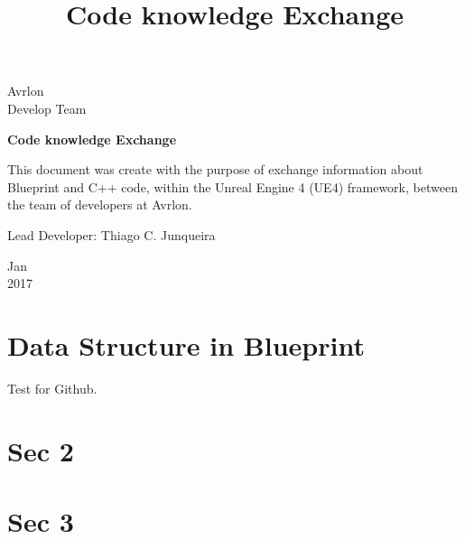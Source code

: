 \documentclass[a4paper, 12pt]{article}
\begin{document}
\begin{titlepage}
	\begin{center}
	

		\Huge{Avrlon}\\
		\large{Develop Team}\\ 
\vspace{15pt}
        
        \vspace{85pt}
        
		\textbf{\LARGE{Code knowledge Exchange}}
		\title{\large{Code knowledge Exchange}}
			
	\end{center}
\vspace{1,5cm}
	
	\begin{flushright}

   \begin{list}{}{
      \setlength{\leftmargin}{4.5cm}
      \setlength{\rightmargin}{0cm}
      \setlength{\labelwidth}{0pt}
      \setlength{\labelsep}{\leftmargin}}

      \item This document was create with the purpose of exchange information about Blueprint and C++ code, within the Unreal Engine 4 (UE4) framework, between the team of developers at Avrlon.    

      \begin{list}{}{
      \setlength{\leftmargin}{0cm}
      \setlength{\rightmargin}{0cm}
      \setlength{\labelwidth}{0pt}
      \setlength{\labelsep}{\leftmargin}}

			\item Lead Developer: Thiago C. Junqueira \

      \end{list}
   \end{list}
\end{flushright}
\vspace{1cm}
\begin{center}
		\vspace{\fill}
		 Jan \\
		 2017
			\end{center}
\end{titlepage}
\newpage
\newpage
\tableofcontents
\thispagestyle{empty}

\newpage
{}
\section{Data Structure in Blueprint}

Test for Github.

\section {Sec 2}



\section{Sec 3}
\label{Sec3}
\end{document}
